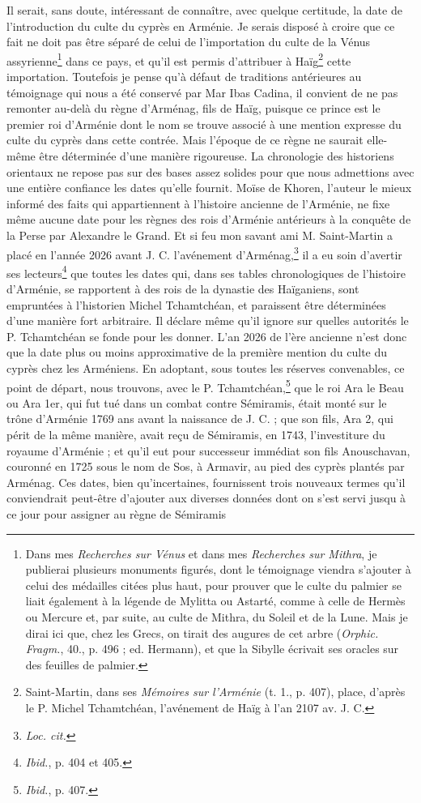 \documentclass[a4paper, 11pt, oneside, polutonikogreek, french]{article}
\begin{document}
Il serait, sans doute, intéressant de connaître, avec quelque certitude, la date de l'introduction du culte du cyprès en Arménie. Je serais disposé à croire que ce fait ne doit pas être séparé de celui de l'importation du culte de la Vénus assyrienne\footnote{Dans mes \emph{Recherches sur Vénus} et dans mes \emph{Recherches sur Mithra}, je publierai plusieurs monuments figurés, dont le témoignage viendra s'ajouter à celui des médailles citées plus haut, pour prouver que le culte du palmier se liait également à la légende de Mylitta ou Astarté, comme à celle de Hermès ou Mercure et, par suite, au culte de Mithra, du Soleil et de la Lune. Mais je dirai ici que, chez les Grecs, on tirait des augures de cet arbre (\emph{Orphic. Fragm.}, 40., p. 496 ; ed. Hermann), et que la Sibylle écrivait ses oracles sur des feuilles de palmier.} dans ce pays, et qu'il est permis d'attribuer à Haïg\footnote{Saint-Martin, dans ses \emph{Mémoires sur l'Arménie} (t. 1., p. 407), place, d'après le P. Michel Tchamtchéan, l'avénement de Haïg à l'an 2107 av. J. C.} cette importation. Toutefois je pense qu'à défaut de traditions antérieures au témoignage qui nous a été conservé par Mar Ibas Cadina, il convient de ne pas remonter au-delà du règne d'Arménag, fils de Haïg, puisque ce prince est le premier roi d'Arménie dont le nom se trouve associé à une mention expresse du culte du cyprès dans cette contrée. Mais l'époque de ce règne ne saurait elle-même être déterminée d'une manière rigoureuse. La chronologie des historiens orientaux ne repose pas sur des bases assez solides pour que nous admettions avec une entière confiance les dates qu'elle fournit. Moïse de Khoren, l'auteur le mieux informé des faits qui appartiennent à l'histoire ancienne de l'Arménie, ne fixe même aucune date pour les règnes des rois d'Arménie antérieurs à la conquête de la Perse par Alexandre le Grand. Et si feu mon savant ami M. Saint-Martin a placé en l'année 2026 avant J. C. l'avénement d'Arménag,\footnote{\emph{Loc. cit.}} il a eu soin d'avertir ses lecteurs\footnote{\emph{Ibid.}, p. 404 et 405.} que toutes les dates qui, dans ses tables chronologiques de l'histoire d'Arménie, se rapportent à des rois de la dynastie des Haïganiens, sont empruntées à l'historien Michel Tchamtchéan, et paraissent être déterminées d'une manière fort arbitraire. Il déclare même qu'il ignore sur quelles autorités le P. Tchamtchéan se fonde pour les donner. L'an 2026 de l'ère ancienne n'est donc que la date plus ou moins approximative de la première mention du culte du cyprès chez les Arméniens. En adoptant, sous toutes les réserves convenables, ce point de départ, nous trouvons, avec le P. Tchamtchéan,\footnote{\emph{Ibid.}, p. 407.} que le roi Ara le Beau ou Ara 1er, qui fut tué dans un combat contre Sémiramis, était monté sur le trône d'Arménie 1769 ans avant la naissance de J. C. ; que son fils, Ara 2, qui périt de la même manière, avait reçu de Sémiramis, en 1743, l'investiture du royaume d'Arménie ; et qu'il eut pour successeur immédiat son fils Anouschavan, couronné en 1725 sous le nom de Sos, à Armavir, au pied des cyprès plantés par Arménag. Ces dates, bien qu'incertaines, fournissent trois nouveaux termes qu'il conviendrait peut-être d'ajouter aux diverses données dont on s'est servi jusqu à ce jour pour assigner au règne de Sémiramis 
\end{document}
